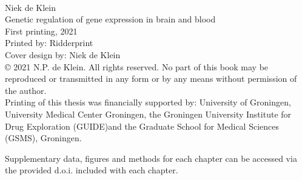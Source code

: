 
\clearpage

{\small
	\noindent
	\vspace*{\fill}
	\\
	Niek de Klein \\
	Genetic regulation of gene expression in brain and blood \\
	
	First printing, 2021 \\
	Printed by: Ridderprint \\
	
	Cover design by: Niek de Klein \\
	
	© 2021 N.P. de Klein. All rights reserved. No part of this book may be reproduced or transmitted in any form or by any means without permission of the author.\\
	
	Printing of this thesis was financially supported by: University of Groningen, University Medical Center Groningen, the Groningen University Institute for Drug Exploration (GUIDE)and the Graduate School for Medical Sciences (GSMS), Groningen.
	
	Supplementary data, figures and methods for each chapter can be accessed via the provided d.o.i. included with each chapter. 
	
}
\clearpage